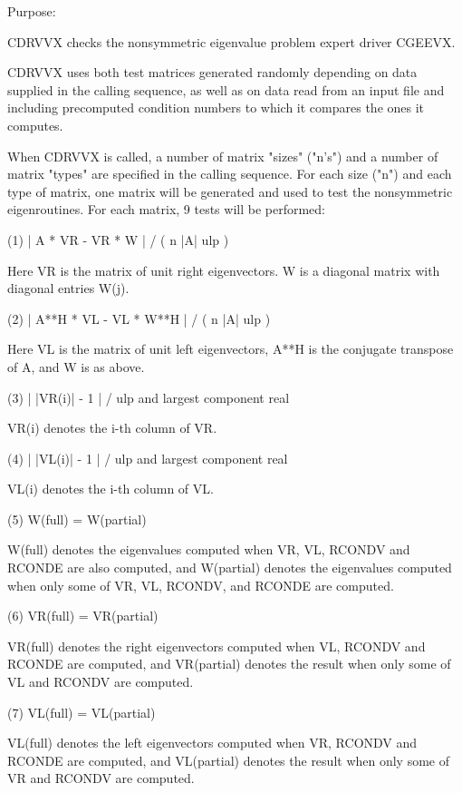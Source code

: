 \begin{DoxyParagraph}{Purpose\+: }
\begin{DoxyVerb}    CDRVVX  checks the nonsymmetric eigenvalue problem expert driver
    CGEEVX.

    CDRVVX uses both test matrices generated randomly depending on
    data supplied in the calling sequence, as well as on data
    read from an input file and including precomputed condition
    numbers to which it compares the ones it computes.

    When CDRVVX is called, a number of matrix "sizes" ("n's") and a
    number of matrix "types" are specified in the calling sequence.
    For each size ("n") and each type of matrix, one matrix will be
    generated and used to test the nonsymmetric eigenroutines.  For
    each matrix, 9 tests will be performed:

    (1)     | A * VR - VR * W | / ( n |A| ulp )

      Here VR is the matrix of unit right eigenvectors.
      W is a diagonal matrix with diagonal entries W(j).

    (2)     | A**H  * VL - VL * W**H | / ( n |A| ulp )

      Here VL is the matrix of unit left eigenvectors, A**H is the
      conjugate transpose of A, and W is as above.

    (3)     | |VR(i)| - 1 | / ulp and largest component real

      VR(i) denotes the i-th column of VR.

    (4)     | |VL(i)| - 1 | / ulp and largest component real

      VL(i) denotes the i-th column of VL.

    (5)     W(full) = W(partial)

      W(full) denotes the eigenvalues computed when VR, VL, RCONDV
      and RCONDE are also computed, and W(partial) denotes the
      eigenvalues computed when only some of VR, VL, RCONDV, and
      RCONDE are computed.

    (6)     VR(full) = VR(partial)

      VR(full) denotes the right eigenvectors computed when VL, RCONDV
      and RCONDE are computed, and VR(partial) denotes the result
      when only some of VL and RCONDV are computed.

    (7)     VL(full) = VL(partial)

      VL(full) denotes the left eigenvectors computed when VR, RCONDV
      and RCONDE are computed, and VL(partial) denotes the result
      when only some of VR and RCONDV are computed.


\end{DoxyVerb}
\end{DoxyParagraph}
